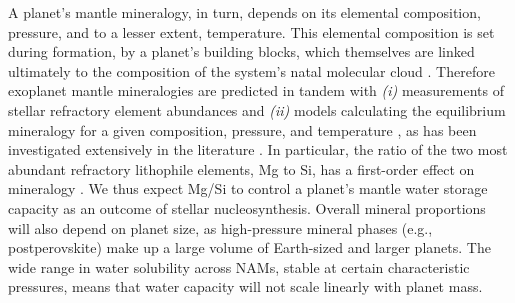 \documentclass[fleqn,usenatbib]{mnras}
\begin{document}
A planet's mantle mineralogy, in turn, depends on its elemental composition, pressure, and to a lesser extent, temperature. This elemental composition is set during formation, by a planet's building blocks, which themselves are linked ultimately to the composition of the system's natal molecular cloud \citep{anders_solar-system_1982, thiabaud_elemental_2015, bonsor_host-star_2021}. Therefore exoplanet mantle mineralogies are predicted in tandem with \textit{(i)} measurements of stellar refractory element abundances and \textit{(ii)} models calculating the equilibrium mineralogy for a given composition, pressure, and temperature \citep[e.g.,][]{connolly_geodynamic_2009}, as has been investigated extensively in the literature \citep{dorn_can_2015, dorn_bayesian_2017, dorn_generalized_2017, dorn_new_2019, unterborn_effects_2017, unterborn_nominal_2022, hinkel_starplanet_2018, otegi_impact_2020, spaargaren_influence_2020, spaargaren_plausible_2022, wang_detailed_2022}. In particular, the ratio of the two most abundant refractory lithophile elements, Mg to Si, has a first-order effect on mineralogy \citep[e.g.,][]{dorn_bayesian_2017, unterborn_effects_2017, hinkel_starplanet_2018, wang_enhanced_2019, spaargaren_influence_2020, spaargaren_plausible_2022}. We thus expect Mg/Si to control a planet's mantle water storage capacity as an outcome of stellar nucleosynthesis. Overall mineral proportions will also depend on planet size, as high-pressure mineral phases (e.g., postperovskite) make up a large volume of Earth-sized and larger planets. The wide range in water solubility across NAMs, stable at certain characteristic pressures, means that water capacity will not scale linearly with planet mass.
\end{document}
